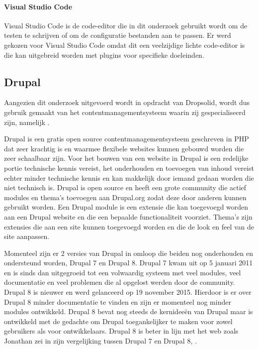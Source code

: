 \paragraph{Visual Studio Code}
Visual Studio Code is de code-editor die in dit onderzoek gebruikt wordt om de testen te schrijven of om de configuratie bestanden aan te passen. Er werd gekozen voor Visual Studio Code omdat dit een veelzijdige lichte code-editor is die kan uitgebreid worden met plugins voor specifieke doeleinden.

\subsection{Drupal}
Aangezien dit onderzoek uitgevoerd wordt in opdracht van Dropsolid, wordt dus gebruik gemaakt van het \gls{contentmanagementsysteem} waarin zij gespecialiseerd zijn, namelijk \textcite{Drupal}.

Drupal is een gratis open source \gls{contentmanagementsysteem} geschreven in PHP dat zeer krachtig is en waarmee flexibele websites kunnen gebouwd worden die zeer schaalbaar zijn. Voor het bouwen van een website in Drupal is een redelijke portie technische kennis vereist, het onderhouden en toevoegen van inhoud vereist echter minder technische kennis en kan makkelijk door iemand gedaan worden die niet technisch is. Drupal is open source en heeft een grote community die actief modules en thema's toevoegen aan Drupal.org zodat deze door anderen kunnen gebruikt worden. Een Drupal module is een extensie die kan toegevoegd worden aan een Drupal website en die een bepaalde functionaliteit voorziet. Thema's zijn extensies die aan een site kunnen toegevoegd worden en die de look en feel van de site aanpassen.

Momenteel zijn er 2 versies van Drupal in omloop die beiden nog onderhouden en ondersteund worden, Drupal 7 en Drupal 8. Drupal 7 kwam uit op 5 januari 2011 en is sinds dan uitgegroeid tot een volwaardig systeem met veel modules, veel documentatie en veel problemen die al opgelost werden door de community. Drupal 8 is nieuwer en werd gelanceerd op 19 november 2015. Hierdoor is er over Drupal 8 minder documentatie te vinden en zijn er momenteel nog minder modules ontwikkeld. Drupal 8 bevat nog steeds de kernideeën van Drupal maar is ontwikkeld met de gedachte om Drupal toegankelijker te maken voor zowel gebruikers als voor ontwikkelaars. Drupal 8 is beter in lijn met het web zoals Jonathan zei in zijn vergelijking tussen Drupal 7 en Drupal 8, \cite{Ramael2015}.

